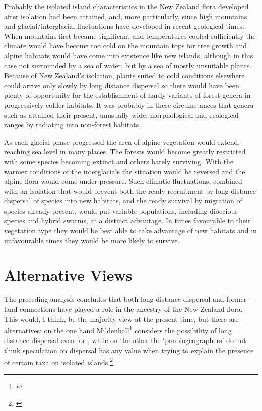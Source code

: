 Probably the isolated island characteristics in the New Zealand flora developed after isolation had been attained, and, more particularly, since high mountains and glacial/interglacial fluctuations have developed in recent geological times.
When mountains first became significant and temperatures cooled sufficiently the climate would have become too cold on the mountain tops for tree growth and alpine habitats would have come into existence like new islands, although in this case not surrounded by a sea of water, but by a sea of mostly unsuitable plants.
Because of New Zealand's isolation, plants suited to cold conditions elsewhere could arrive only slowly by long distance dispersal so there would have been plenty of opportunity for the establishment of hardy variants of forest genera in progressively colder habitats.
It was probably in these circumstances that genera such as  attained their present, unusually wide, morphological and ecological ranges by radiating into non-forest habitats.

As each glacial phase progressed the area of alpine vegetation would extend, reaching sea level in many places.
The forests would become greatly restricted with some species becoming extinct and others barely surviving.
With the warmer conditions of the interglacials the situation would be reversed and the alpine flora would come under pressure.
Such climatic fluctuations, combined with an isolation that would prevent both the ready recruitment by long distance dispersal of species into new habitats, and the ready survival by migration of species already present, would put variable populations, including dioecious species and hybrid swarms, at a distinct advantage.
In times favourable to their vegetation type they would be best able to take advantage of new habitats and in unfavourable times they would be more likely to survive.

\section{Alternative Views}

The preceding analysis concludes that both long distance dispersal and former land connections have played a role in the ancestry of the New Zealand flora.
This would, I think, be the majority view at the present time, but there are alternatives: on the one hand Mildenhall\footnote{\cite{mildenhall1980new}} considers the possibility of long distance dispersal even for , while on the other the `panbiogeographers' do not think speculation on dispersal has any value when trying to explain the presence of certain taxa on isolated islands.\footnote{\cite{craw1982phylogenetics}}

